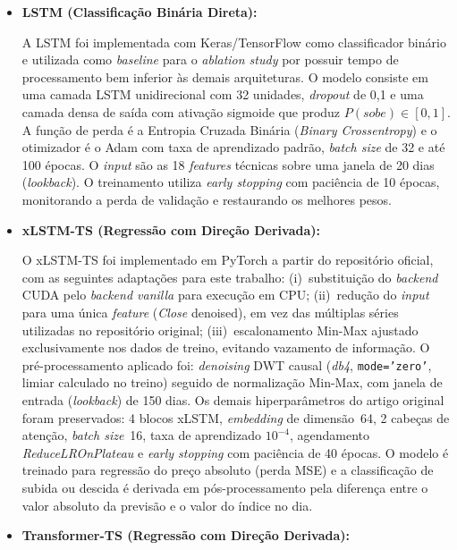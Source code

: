 \begin{itemize}    
    \item \textbf{LSTM (Classificação Binária Direta):}

    A LSTM foi implementada com Keras/TensorFlow como classificador binário e utilizada como \textit{baseline} para o \textit{ablation study} por possuir tempo de processamento bem inferior às demais arquiteturas. O modelo consiste em uma camada LSTM unidirecional com 32 unidades, \textit{dropout} de 0{,}1 e uma camada densa de saída com ativação sigmoide que produz $P(\textit{sobe}) \in [0,1]$. A função de perda é a Entropia Cruzada Binária (\textit{Binary Crossentropy}) e o otimizador é o Adam com taxa de aprendizado padrão, \textit{batch size} de 32 e até 100 épocas. O \textit{input} são as 18 \textit{features} técnicas sobre uma janela de 20 dias (\textit{lookback}). O treinamento utiliza \textit{early stopping} com paciência de 10 épocas, monitorando a perda de validação e restaurando os melhores pesos.


    \item \textbf{xLSTM-TS (Regressão com Direção Derivada):}

    O xLSTM-TS  foi implementado em PyTorch a partir do repositório oficial, com as seguintes adaptações para este trabalho: (i)~substituição do \textit{backend} CUDA pelo \textit{backend vanilla} para execução em CPU; (ii)~redução do \textit{input} para uma única \textit{feature} (\textit{Close} denoised), em vez das múltiplas séries utilizadas no repositório original; (iii)~escalonamento Min-Max ajustado exclusivamente nos dados de treino, evitando vazamento de informação. O pré-processamento aplicado foi: \textit{denoising} DWT causal (\textit{db4}, \texttt{mode='zero'}, limiar calculado no treino) seguido de normalização Min-Max, com janela de entrada (\textit{lookback}) de 150 dias. Os demais hiperparâmetros do artigo original foram preservados: 4 blocos xLSTM, \textit{embedding} de dimensão~64, 2 cabeças de atenção, \textit{batch size}~16, taxa de aprendizado $10^{-4}$, agendamento \textit{ReduceLROnPlateau} e \textit{early stopping} com paciência de 40 épocas. O modelo é treinado para regressão do preço absoluto (perda MSE) e a classificação de subida ou descida é derivada em pós-processamento pela diferença entre o valor absoluto da previsão e o valor do índice no dia.


    \item \textbf{Transformer-TS (Regressão com Direção Derivada):}


\end{itemize}
